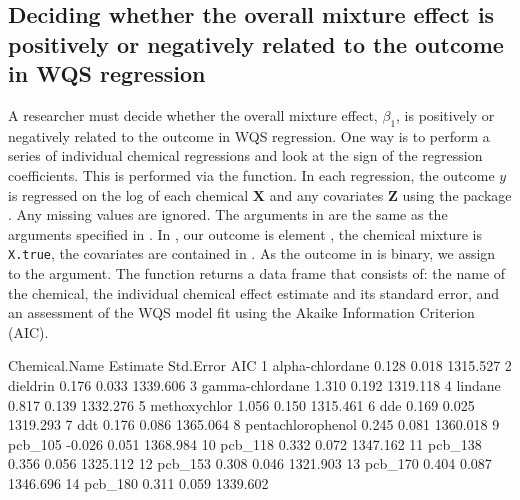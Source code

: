\hypertarget{deciding-whether-the-overall-mixture-effect-is-positively-or-negatively-related-to-the-outcome-in-wqs-regression}{%
\subsection{Deciding whether the overall mixture effect is positively or
negatively related to the outcome in WQS
regression}\label{deciding-whether-the-overall-mixture-effect-is-positively-or-negatively-related-to-the-outcome-in-wqs-regression}}

A researcher must decide whether the overall mixture effect,
\(\beta_1\), is positively or negatively related to the outcome in WQS
regression. One way is to perform a series of individual chemical
regressions and look at the sign of the regression coefficients. This is
performed via the  function. In each
regression, the outcome \(y\) is regressed on the log of each chemical
\(\boldsymbol{X}\) and any covariates \(\boldsymbol{Z}\) using the
 package \citep{marschnerGlm2FittingGeneralized2011}. Any
missing values are ignored. The arguments in
 are the same as the arguments specified in
. In , our outcome is element
, the chemical mixture is \texttt{X.true}, the
covariates are contained in . As the outcome in
 is binary, we assign  to the
 argument. The  function
returns a data frame that consists of: the name of the chemical, the
individual chemical effect estimate and its standard error, and an
assessment of the WQS model fit using the Akaike Information Criterion
(AIC).

\begin{Schunk}
\begin{Soutput}
       Chemical.Name Estimate Std.Error      AIC
1    alpha-chlordane    0.128     0.018 1315.527
2           dieldrin    0.176     0.033 1339.606
3    gamma-chlordane    1.310     0.192 1319.118
4            lindane    0.817     0.139 1332.276
5       methoxychlor    1.056     0.150 1315.461
6                dde    0.169     0.025 1319.293
7                ddt    0.176     0.086 1365.064
8  pentachlorophenol    0.245     0.081 1360.018
9            pcb_105   -0.026     0.051 1368.984
10           pcb_118    0.332     0.072 1347.162
11           pcb_138    0.356     0.056 1325.112
12           pcb_153    0.308     0.046 1321.903
13           pcb_170    0.404     0.087 1346.696
14           pcb_180    0.311     0.059 1339.602
\end{Soutput}
\end{Schunk}

